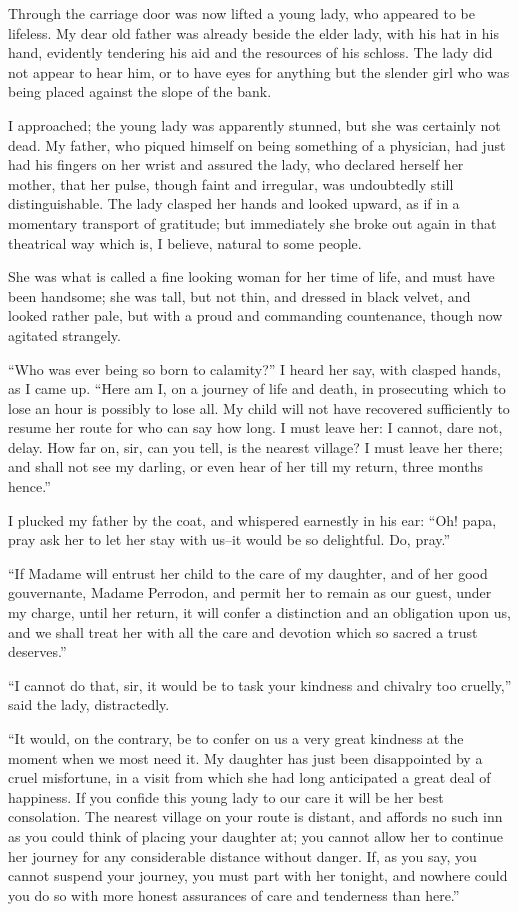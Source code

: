 \documentclass[11pt,twoside,makeidx,hidelinks,]{memoir}
\begin{document}
Through the carriage door was now lifted a young lady, who appeared to
be lifeless. My dear old father was already beside the elder lady, with
his hat in his hand, evidently tendering his aid and the resources of
his schloss. The lady did not appear to hear him, or to have eyes for
anything but the slender girl who was being placed against the slope
of the bank.

I approached; the young lady was apparently stunned, but she was
certainly not dead. My father, who piqued himself on being something of
a physician, had just had his fingers on her wrist and assured the lady,
who declared herself her mother, that her pulse, though faint and
irregular, was undoubtedly still distinguishable. The lady clasped her
hands and looked upward, as if in a momentary transport of gratitude;
but immediately she broke out again in that theatrical way which is, I
believe, natural to some people.

She was what is called a fine looking woman for her time of life, and
must have been handsome; she was tall, but not thin, and dressed in
black velvet, and looked rather pale, but with a proud and commanding
countenance, though now agitated strangely.

``Who was ever being so born to calamity?'' I heard her say, with clasped
hands, as I came up. ``Here am I, on a journey of life and death, in
prosecuting which to lose an hour is possibly to lose all. My child will
not have recovered sufficiently to resume her route for who can say how
long. I must leave her: I cannot, dare not, delay. How far on, sir, can
you tell, is the nearest village? I must leave her there; and shall not
see my darling, or even hear of her till my return, three months hence.''

I plucked my father by the coat, and whispered earnestly in his ear:
``Oh! papa, pray ask her to let her stay with us--it would be so
delightful. Do, pray.''

``If Madame will entrust her child to the care of my daughter, and of her
good gouvernante, Madame Perrodon, and permit her to remain as our
guest, under my charge, until her return, it will confer a distinction
and an obligation upon us, and we shall treat her with all the care and
devotion which so sacred a trust deserves.''

``I cannot do that, sir, it would be to task your kindness and chivalry
too cruelly,'' said the lady, distractedly.

``It would, on the contrary, be to confer on us a very great kindness at
the moment when we most need it. My daughter has just been disappointed
by a cruel misfortune, in a visit from which she had long anticipated a
great deal of happiness. If you confide this young lady to our care it
will be her best consolation. The nearest village on your route is
distant, and affords no such inn as you could think of placing your
daughter at; you cannot allow her to continue her journey for any
considerable distance without danger. If, as you say, you cannot suspend
your journey, you must part with her tonight, and nowhere could you do
so with more honest assurances of care and tenderness than here.''
\end{document}
